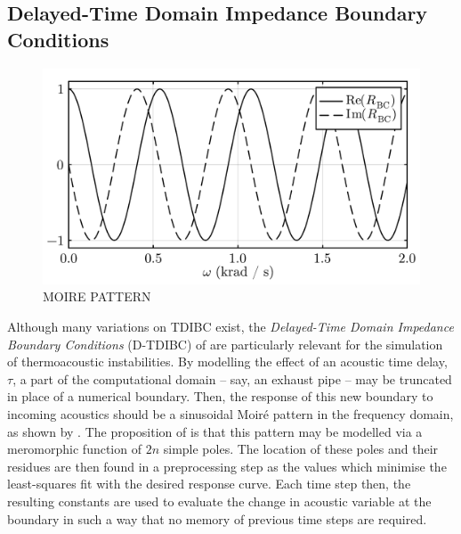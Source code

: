\subsection{Delayed-Time Domain Impedance Boundary Conditions}




\begin{figure}[t]
\centering
\includegraphics[scale=0.35]{assets/graphs/complex_R_Moire.pdf}
\caption{MOIRE PATTERN}
\label{fig:moire}
\end{figure}

Although many variations on TDIBC exist, the \emph{Delayed-Time Domain Impedance Boundary Conditions} (D-TDIBC) of \cite{douasbin2018DelayedtimeDomainImpedance} are particularly relevant for the simulation of thermoacoustic instabilities. By modelling the effect of an acoustic time delay, $τ$, a part of the computational domain -- say, an exhaust pipe -- may be truncated in place of a numerical boundary. Then, the response of this new boundary to incoming acoustics should be a sinusoidal Moiré pattern in the frequency domain, as shown by . The proposition of \cite{douasbin2018DelayedtimeDomainImpedance} is that this pattern may be modelled via a meromorphic function of $2n$ simple poles. The location of these poles and their residues are then found in a preprocessing step as the values which minimise the least-squares fit with the desired response curve. Each time step then, the resulting constants are used to evaluate the change in acoustic variable at the boundary in such a way that no memory of previous time steps are required. 

